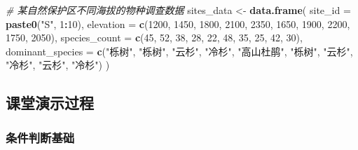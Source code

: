 \documentclass[
]{book}
\newenvironment{Shaded}{\begin{snugshade}}{\end{snugshade}}
\newcommand{\AttributeTok}[1]{\textcolor[rgb]{0.13,0.29,0.53}{#1}}
\newcommand{\CommentTok}[1]{\textcolor[rgb]{0.56,0.35,0.01}{\textit{#1}}}
\newcommand{\DecValTok}[1]{\textcolor[rgb]{0.00,0.00,0.81}{#1}}
\newcommand{\FunctionTok}[1]{\textcolor[rgb]{0.13,0.29,0.53}{\textbf{#1}}}
\newcommand{\NormalTok}[1]{#1}
\newcommand{\OtherTok}[1]{\textcolor[rgb]{0.56,0.35,0.01}{#1}}
\newcommand{\SpecialCharTok}[1]{\textcolor[rgb]{0.81,0.36,0.00}{\textbf{#1}}}
\newcommand{\StringTok}[1]{\textcolor[rgb]{0.31,0.60,0.02}{#1}}
\begin{document}
\begin{Shaded}
\begin{Highlighting}[]
\CommentTok{\# 某自然保护区不同海拔的物种调查数据}
\NormalTok{sites\_data }\OtherTok{\textless{}{-}} \FunctionTok{data.frame}\NormalTok{(}
  \AttributeTok{site\_id =} \FunctionTok{paste0}\NormalTok{(}\StringTok{"S"}\NormalTok{, }\DecValTok{1}\SpecialCharTok{:}\DecValTok{10}\NormalTok{),}
  \AttributeTok{elevation =} \FunctionTok{c}\NormalTok{(}\DecValTok{1200}\NormalTok{, }\DecValTok{1450}\NormalTok{, }\DecValTok{1800}\NormalTok{, }\DecValTok{2100}\NormalTok{, }\DecValTok{2350}\NormalTok{, }\DecValTok{1650}\NormalTok{, }\DecValTok{1900}\NormalTok{, }\DecValTok{2200}\NormalTok{, }\DecValTok{1750}\NormalTok{, }\DecValTok{2050}\NormalTok{),}
  \AttributeTok{species\_count =} \FunctionTok{c}\NormalTok{(}\DecValTok{45}\NormalTok{, }\DecValTok{52}\NormalTok{, }\DecValTok{38}\NormalTok{, }\DecValTok{28}\NormalTok{, }\DecValTok{22}\NormalTok{, }\DecValTok{48}\NormalTok{, }\DecValTok{35}\NormalTok{, }\DecValTok{25}\NormalTok{, }\DecValTok{42}\NormalTok{, }\DecValTok{30}\NormalTok{),}
  \AttributeTok{dominant\_species =} \FunctionTok{c}\NormalTok{(}\StringTok{"栎树"}\NormalTok{, }\StringTok{"栎树"}\NormalTok{, }\StringTok{"云杉"}\NormalTok{, }\StringTok{"冷杉"}\NormalTok{, }\StringTok{"高山杜鹃"}\NormalTok{, }\StringTok{"栎树"}\NormalTok{, }\StringTok{"云杉"}\NormalTok{, }\StringTok{"冷杉"}\NormalTok{, }\StringTok{"云杉"}\NormalTok{, }\StringTok{"冷杉"}\NormalTok{)}
\NormalTok{)}
\end{Highlighting}
\end{Shaded}

\hypertarget{ux8bfeux5802ux6f14ux793aux8fc7ux7a0b-7}{%
\subsection{课堂演示过程}\label{ux8bfeux5802ux6f14ux793aux8fc7ux7a0b-7}}

\hypertarget{ux6761ux4ef6ux5224ux65adux57faux7840}{%
\subsubsection{条件判断基础}\label{ux6761ux4ef6ux5224ux65adux57faux7840}}
\end{document}
